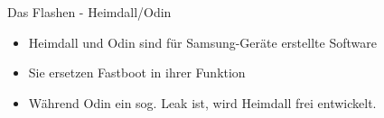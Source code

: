 \begin{frame}{Das Flashen - Heimdall/Odin}
	\begin{itemize}[<+->]
		\item Heimdall und Odin sind für Samsung-Geräte erstellte Software
		\item Sie ersetzen Fastboot in ihrer Funktion
		\item Während Odin ein sog. Leak ist, wird Heimdall frei entwickelt.
	\end{itemize}
\end{frame}
